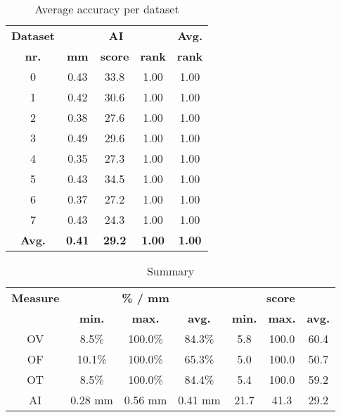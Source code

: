 \begin{table*}
\scriptsize
\caption{Average accuracy per dataset}
\centering
\begin{tabular}{|c|ccc|c|}
\hline
\multicolumn{1}{|c|}{\textbf{Dataset}} &\multicolumn{3}{c|}{\textbf{AI}} &\multicolumn{1}{c|}{\textbf{Avg.}} \\
\multicolumn{1}{|c|}{\textbf{nr.}} &\multicolumn{1}{c|}{\textbf{mm}} &\multicolumn{1}{c|}{\textbf{score}} &\multicolumn{1}{c|}{\textbf{rank}} &\multicolumn{1}{c|}{\textbf{rank}}\\
\hline
0&0.43&33.8& 1.00& 1.00\\
1&0.42&30.6& 1.00& 1.00\\
2&0.38&27.6& 1.00& 1.00\\
3&0.49&29.6& 1.00& 1.00\\
4&0.35&27.3& 1.00& 1.00\\
5&0.43&34.5& 1.00& 1.00\\
6&0.37&27.2& 1.00& 1.00\\
7&0.43&24.3& 1.00& 1.00\\
\hline
\textbf{Avg.}&\textbf{0.41}&\textbf{29.2}&\textbf{ 1.00}&\textbf{ 1.00}\\
\hline
\end{tabular}
\vspace{-0.3cm}
\label{tb:tb_4_2}
\normalsize
\end{table*}

\begin{table*}
\scriptsize
\caption{Summary}
\centering
\begin{tabular}{|c|ccc|ccc|}
\hline
\multicolumn{1}{|c|}{\textbf{Measure}} &\multicolumn{3}{c|}{\textbf{\% / mm}} &\multicolumn{3}{c|}{\textbf{score}}  \\
\multicolumn{1}{|c|}{\textbf{}} &\multicolumn{1}{c|}{\textbf{min.}} &\multicolumn{1}{c|}{\textbf{max.}} &\multicolumn{1}{c|}{\textbf{avg.}} &\multicolumn{1}{c|}{\textbf{min.}} &\multicolumn{1}{c|}{\textbf{max.}} &\multicolumn{1}{c|}{\textbf{avg.}}\\
\hline
OV& 8.5\%&100.0\%&84.3\%& 5.8&100.0&60.4\\
OF&10.1\%&100.0\%&65.3\%& 5.0&100.0&50.7\\
OT& 8.5\%&100.0\%&84.4\%& 5.4&100.0&59.2\\
AI&0.28 mm&0.56 mm&0.41 mm&21.7&41.3&29.2\\
\hline
\end{tabular}
\vspace{-0.3cm}
\label{tb:tb_4_3}
\normalsize
\end{table*}



